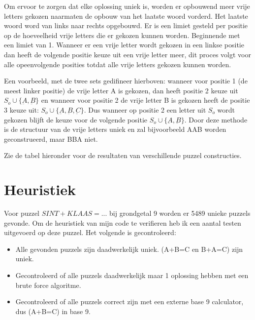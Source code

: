 \documentclass[twocolumn,10pt]{article}
\begin{document}
Om ervoor te zorgen dat elke oplossing uniek is, worden er opbouwend meer vrije letters gekozen naarmaten de opbouw van het laatste woord vorderd. Het laatste woord word van links naar rechts opgebouwd. Er is een limiet gesteld per positie op de hoeveelheid vrije letters die er gekozen kunnen worden. Beginnende met een limiet van 1. Wanneer er een vrije letter wordt gekozen in een linkse positie dan heeft de volgende positie keuze uit een vrije letter meer, dit proces volgt voor alle opeenvolgende posities totdat alle vrije letters gekozen kunnen worden.

Een voorbeeld, met de twee sets gedifineer hierboven: wanneer voor positie 1 (de meest linker positie) de vrije letter A is gekozen, dan heeft positie 2 keuze uit $S_o \cup \{\underbar{A}, \underbar{B}\}$ en wanneer voor positie 2 de vrije letter B is gekozen heeft de positie 3 keuze uit: $S_o \cup \{\underbar{A}, \underbar{B}, \underbar{C}\}$. Dus wanneer op positie 2 een letter uit $S_o$ wordt gekozen blijft de keuze voor de volgende positie $S_o \cup \{\underbar{A}, \underbar{B}\}$. Door deze methode is de structuur van de vrije letters uniek en zal bijvoorbeeld AAB worden geconstrueerd, maar BBA niet.

Zie de tabel hieronder voor de resultaten van verschillende puzzel constructies.
\begin{table}[h]
    \centering
    \caption{Resultaten van verschillende constructies.}
\end{table}
\FloatBarrier

\section*{Heuristiek}
Voor puzzel $SINT+KLAAS=...$ bij grondgetal 9 worden er 5489 unieke puzzels gevonde.
Om de heuristiek van mijn code te verifieren heb ik een aantal testen uitgevoerd op deze puzzel.
Het volgende is gecontroleerd:
\begin{itemize}
    \item Alle gevonden puzzels zijn daadwerkelijk uniek. (A+B=C en B+A=C) zijn uniek.
    \item Gecontroleerd of alle puzzels daadwerkelijk maar 1 oplossing hebben met een brute force algoritme.
    \item Gecontroleerd of alle puzzels correct zijn met een externe base 9 calculator, dus (A+B=C) in base 9.
\end{itemize}
\end{document}
